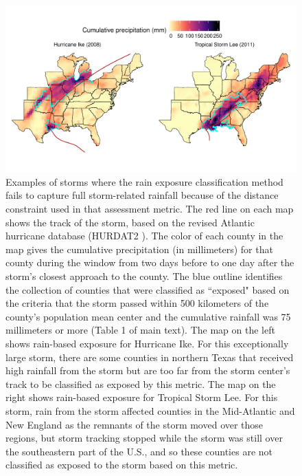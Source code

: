 \documentclass[fleqn,10pt,lineno]{olplainarticle}
\begin{document}
\begin{figure}[tbhp!]
\centering
\includegraphics[width=0.9\linewidth]{figures/rainexamples}
\caption{Examples of storms where the rain exposure classification method fails to capture full storm-related rainfall because of the distance constraint used in that assessment metric. The red line on each map shows the track of the storm, based on the revised Atlantic hurricane database (HURDAT2 \cite{landsea2013}). The color of each county in the map gives the cumulative precipitation (in millimeters) for that county during the window from two days before to one day after the storm's closest approach to the county. The blue outline identifies the collection of counties that were classified as ``exposed" based on the criteria that the storm passed within 500 kilometers of the county's population mean center and the cumulative rainfall was 75 millimeters or more (Table 1 of main text). The map on the left shows rain-based exposure for Hurricane Ike. For this exceptionally large storm, there are some counties in northern Texas that received high rainfall from the storm but are too far from the storm center's track to be classified as exposed by this metric. The map on the right shows rain-based exposure for Tropical Storm Lee. For this storm, rain from the storm affected counties in the Mid-Atlantic and New England as the remnants of the storm moved over those regions, but storm tracking stopped while the storm was still over the southeastern part of the U.S., and so these counties are not classified as exposed to the storm based on this metric.}
\label{fig:rainexamples}
\end{figure}

\clearpage
\end{document}
